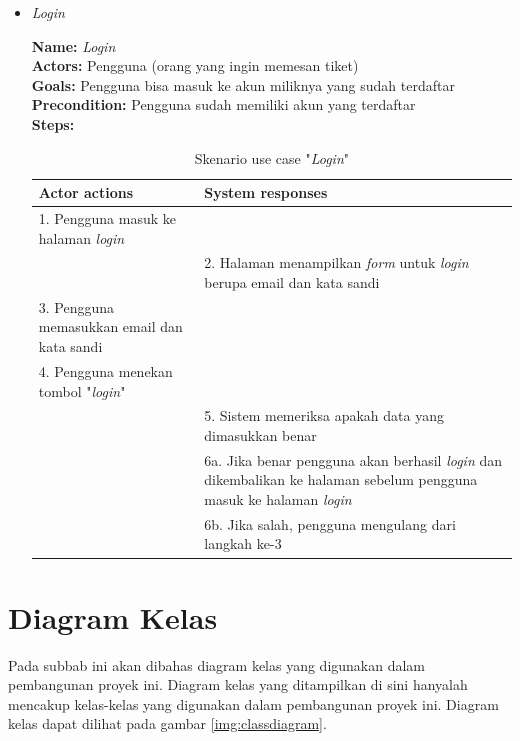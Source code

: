 \begin{itemize}
	\item \textit{Login}
	
	\textbf{Name: }\textit{Login}\\
	\textbf{Actors: }Pengguna (orang yang ingin memesan tiket)\\
	\textbf{Goals: }Pengguna bisa masuk ke akun miliknya yang sudah terdaftar\\
	\textbf{Precondition: }Pengguna sudah memiliki akun yang terdaftar\\
	\textbf{Steps: }
	\begin{table}[H]
		\centering
		\caption{Skenario use case "\textit{Login}"}
		\label{tab:usecase6} 
		\begin{tabular}{|p{7cm}|p{7cm}|}
			\hline
			\textbf{Actor actions} & \textbf{System responses} \\ \hline
			1. Pengguna masuk ke halaman \textit{login} & \\
			  & 2. Halaman menampilkan \textit{form} untuk \textit{login} berupa email dan kata sandi \\
			3. Pengguna memasukkan email dan kata sandi & \\ 
			4. Pengguna menekan tombol "\textit{login}" & \\
			  & 5. Sistem memeriksa apakah data yang dimasukkan benar\\
			  & 6a. Jika benar pengguna akan berhasil \textit{login} dan dikembalikan ke halaman sebelum pengguna masuk ke halaman \textit{login}\\
			  & 6b. Jika salah, pengguna mengulang dari langkah ke-3\\
			\hline
		\end{tabular}
	\end{table}	
	
	
\end{itemize}

\section{Diagram Kelas}
\label{sec:diagramkelas}

Pada subbab ini akan dibahas diagram kelas yang digunakan dalam pembangunan proyek ini. Diagram kelas yang ditampilkan di sini hanyalah mencakup kelas-kelas yang digunakan dalam pembangunan proyek ini. Diagram kelas dapat dilihat pada gambar \ref{img:classdiagram}.

